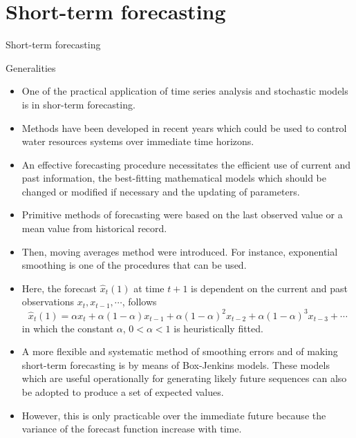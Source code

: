 \documentclass[8pt]{beamer}
\renewcommand{\emph}[1]{\textcolor{myorange}{#1}}
\begin{document}
\section{Short-term forecasting}
\begin{frame}{Short-term forecasting}
    \begin{block}{Generalities}
    \end{block}
    \begin{itemize}
        \item One of the practical application of \emph{time series analysis} and \emph{stochastic models} is in \alert{shor-term forecasting}. 
        \item Methods have been developed in recent years which could be used to \emph{control water resources systems} over \emph{immediate time horizons}. 
        \item An effective forecasting procedure necessitates the efficient use of \emph{current and past information}, the \emph{best-fitting mathematical models} which should be changed or modified if necessary and the \emph{updating of parameters}.
        \item Primitive methods of forecasting were based on the \emph{last observed value} or a \emph{mean value} from historical record. 
        \item Then, \alert{moving averages} method were introduced. For instance, \emph{exponential smoothing} is one of the procedures that can be used. 
        \item Here, the forecast $\hat{x}_t (1)$ at time $t+1$ is dependent on the current and past observations $x_t, x_{t-1}, \cdots$, follows
\begin{equation}
    \hat{x}_t (1) = \alpha x_t + \alpha(1-\alpha)x_{t-1} + \alpha(1-\alpha)^2 x_{t-2} + \alpha(1-\alpha)^3 x_{t-3} + \cdots 
        \label{e478}
    \end{equation}
    in which the constant $\alpha$, $0<\alpha<1$ is heuristically fitted.
\item A more \emph{flexible} and \emph{systematic} method of smoothing errors and of making \emph{short-term forecasting} is by means of \emph{Box-Jenkins models}. These models which are useful operationally for generating likely future sequences can also be adopted to produce a set of expected values.
\item However, this is only practicable over the \emph{immediate future} because the variance of the forecast function increase with time. 
 
    \end{itemize}
\end{frame}
\end{document}
